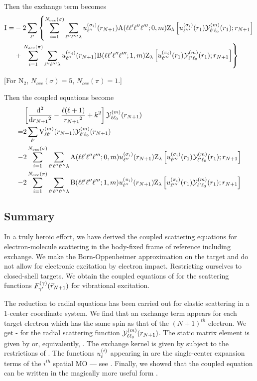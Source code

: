 \documentclass[aps,pra,groupedaddress,12pt,
               amsfonts,amssymb,
               preprint
    ]{revtex4}
\begin{document}
Then the exchange term becomes
\begin{equation}
  \label{eq:ETa}
    \begin{split}
    \mathrm{I} = & -2\sum_{\ell'}\left\{\sum_{i=1}^{N_{occ}(\sigma)}\sum_{\ell''\ell'''\lambda}
  u_{\ell''}^{(\sigma_i)}(r_{N+1})\mathrm{A}(\ell\ell'\ell''\ell''';0,m)\mathrm{Z}_{\lambda}\left[u_{\ell'''}^{(\sigma_i)}(r_1)\mathcal{Y}_{\ell'\ell_0}^{(m)}(r_{1});r_{N+1}\right]\right. \\
       & + \left.\sum_{i=1}^{N_{occ}(\pi)}\sum_{\ell''\ell'''\lambda}
  u_{\ell''}^{(\pi_i)}(r_{N+1})\mathrm{B}(\ell\ell'\ell''\ell''';1,m)\mathrm{Z}_{\lambda}\left[u_{\ell'''}^{(\pi_i)}(r_1)\mathcal{Y}_{\ell'\ell_0}^{(m)}(r_{1});r_{N+1}\right]\right\}
  \end{split}
\end{equation}

[For N$_2$, $N_{occ}(\sigma) = 5$, $N_{occ}(\pi) = 1$.]

Then the coupled equations  become
\begin{equation}
  \label{eq:CEESN}
  \begin{split}
    &\left[\dfrac{\mathrm{d}^2}{\mathrm{d} r_{N+1}{}^2}
      -\dfrac{\ell(\ell+1)}{r_{N+1}{}^2}+k^2\right]\mathcal{Y}_{\ell\ell_0}^{(m)}(r_{N+1}) \\
    = & 2\sum_{\ell'}\mathrm{V}_{\ell\ell'}^{(m)}(r_{N+1})\mathcal{Y}_{\ell'\ell_0}^{(m)}(r_{N+1})  \\
    - & 2\sum_{i=1}^{N_{occ}(\sigma)}\sum_{\ell'\ell''\ell'''\lambda}
        \mathrm{A}(\ell\ell'\ell''\ell''';0,m)u_{\ell''}^{(\sigma_i)}(r_{N+1})\mathrm{Z}_{\lambda}\left[u_{\ell'''}^{(\sigma_i)}(r_1)\mathcal{Y}_{\ell'\ell_0}^{(m)}(r_{1});r_{N+1}\right] \\
    - & 2\sum_{i=1}^{N_{occ}(\pi)}\sum_{\ell'\ell''\ell'''\lambda}
        \mathrm{B}(\ell\ell'\ell''\ell''';1,m)u_{\ell''}^{(\pi_i)}(r_{N+1})\mathrm{Z}_{\lambda}\left[u_{\ell'''}^{(\pi_i)}(r_1)\mathcal{Y}_{\ell'\ell_0}^{(m)}(r_{1});r_{N+1}\right]
  \end{split}
\end{equation}

\subsection{Summary}
\label{sec:summary}
In a truly heroic effort, we have derived the coupled scattering
equations for electron-molecule scattering in the body-fixed frame of
reference including exchange. We make the Born-Oppenheimer approximation
on the target and do not allow for electronic excitation by electron
impact. Restricting ourselves to closed-shell targets. We obtain the
coupled equations of  for the scattering functions $F_{\gamma'}^{(\gamma)}(\vec{r}_{N+1})$ for
vibrational excitation. 

The reduction to radial equations has been carried out for elastic
scattering in a 1-center coordinate system. We find that an exchange
term appears for each target electron which has the same spin as that of
the $(N+1)^{th}$ electron. We get - for the radial
scattering function $\mathcal{Y}_{\ell\ell_0}^{(m)}(r_{N+1})$. The static matrix element is given by
 or, equivalently, . The exchange kernel is given by
 subject to the restrictions of . The functions
$u_{\ell}^{(i)}$ appearing in  are the single-center
expansion terms of the $i^{th}$ spatial MO --- see . Finally,
we showed that the coupled equation can be written in the magically more
useful form .
\end{document}
